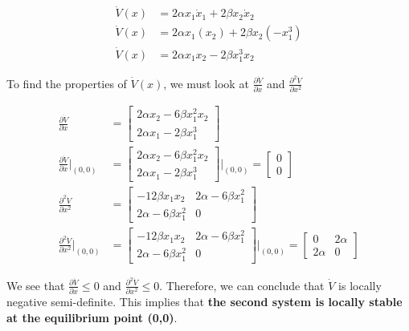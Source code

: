 \documentclass{article}
\begin{document}
  \begin{align*}
    \dot{V}(x) &= 2\alpha x_1\dot{x}_1 + 2\beta x_2\dot{x}_2 \\
    \dot{V}(x) &= 2\alpha x_1(x_2) + 2\beta x_2(-x_1^3) \\
    \dot{V}(x) &= 2\alpha x_1x_2 - 2\beta x_1^3x_2 
  \end{align*}

  \noindent To find the properties of $\dot{V}(x)$, we must look at $\frac{\partial
    \dot{V}}{\partial x}$ and $\frac{\partial^2 \dot{V}}{\partial x^2}$

  \begin{align*}
    \frac{\partial \dot{V}}{\partial x} &= \begin{bmatrix}
      2\alpha x_2 - 6\beta x_1^2x_2 \\
      2\alpha x_1 - 2\beta x_1^3
    \end{bmatrix} \\
    \frac{\partial \dot{V}}{\partial x}\rvert_{(0,0)} &= \begin{bmatrix}
      2\alpha x_2 - 6\beta x_1^2x_2 \\
      2\alpha x_1 - 2\beta x_1^3
    \end{bmatrix}\rvert_{(0,0)} = \begin{bmatrix}
      0 \\
      0
    \end{bmatrix} \\
    \frac{\partial^2 \dot{V}}{\partial x^2} &= \begin{bmatrix}
      -12\beta x_1x_2 & 2\alpha - 6\beta x_1^2 \\
      2\alpha - 6\beta x_1^2 & 0
    \end{bmatrix} \\
    \frac{\partial^2 \dot{V}}{\partial x^2}\rvert_{(0,0)} &= \begin{bmatrix}
      -12\beta x_1x_2 & 2\alpha - 6\beta x_1^2 \\
      2\alpha - 6\beta x_1^2 & 0
    \end{bmatrix}\rvert_{(0,0)} =
    \begin{bmatrix}
      0 & 2\alpha \\
      2\alpha & 0
    \end{bmatrix}
  \end{align*}

  We see that $\frac{\partial \dot{V}}{\partial x} \leq 0$ and $\frac{\partial^2
    \dot{V}}{\partial x^2} \leq 0$. Therefore, we can conclude that $\dot{V}$ is
  locally negative semi-definite. \newline \newline
  \indent This implies that \textbf{the second system is locally stable at the
    equilibrium point (0,0)}. \newpage
\end{document}
